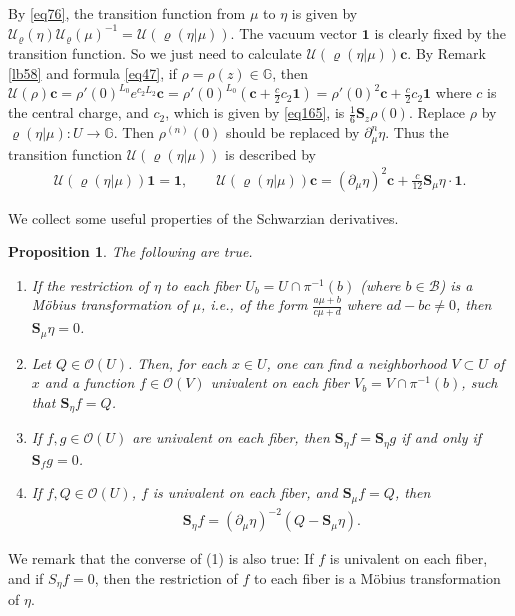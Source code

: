 \documentclass[12pt,b5paper,notitlepage]{report}
\theoremstyle{definition}
\theoremstyle{plain}
\newtheorem{pp}[df]{Proposition}
\newcommand{\mc}{\mathcal}
\newcommand{\id}{\mathbf{1}}
\newcommand{\scr}{\mathscr}
\newcommand{\Gbb}{\mathbb G}
\newcommand{\cbf}{\mathbf c}
\newcommand{\Sbf}{\mathbf{S}}
\numberwithin{equation}{section}
\begin{document}
By \eqref{eq76}, the transition function from $\mu$ to $\eta$ is given by $\mc U_\varrho(\eta)\mc U_\varrho(\mu)^{-1}=\mc U(\varrho(\eta|\mu))$. The vacuum vector $\id$ is clearly fixed by the transition function. So we just need to calculate $\mc U(\varrho(\eta|\mu))\cbf$. By Remark \ref{lb58} and formula \eqref{eq47}, if $\rho=\rho(z)\in\Gbb$, then $\mc U(\rho)\cbf=\rho'(0)^{L_0}e^{c_2L_2}\cbf=\rho'(0)^{L_0}(\cbf+\frac c2c_2\id)=\rho'(0)^2\cbf+\frac c2c_2\id$ where $c$ is the central charge, and $c_2$, which is given by \eqref{eq165}, is $\frac 16\Sbf_z\rho(0)$. Replace $\rho$ by $\varrho(\eta|\mu):U\rightarrow\Gbb$. Then $\rho^{(n)}(0)$ should be replaced by $\partial_\mu^n\eta$. Thus the transition function $\mc U(\varrho(\eta|\mu))$  is described by
\begin{gather}
\mc U(\varrho(\eta|\mu))\id=\id,\qquad  \mc U(\varrho(\eta|\mu))\cbf=(\partial_\mu\eta)^2\cbf+\frac {c}{12}\Sbf_\mu\eta \cdot \id.\label{eq169}
\end{gather}



We collect some useful properties of the Schwarzian derivatives.  

\begin{pp}\label{lb70}
The following are true.
\begin{enumerate}[label=(\arabic*)]
\item If the restriction of $\eta$ to each fiber $U_b=U\cap\pi^{-1}(b)$ (where $b\in\mc B$) is a M\"obius transformation of $\mu$, i.e., of the form $\frac{a\mu+b}{c\mu+d}$ where $ad-bc\neq 0$, then $\Sbf_\mu \eta=0$.
\item  Let $Q\in\scr O(U)$. Then, for each $x\in U$, one can find a neighborhood $V\subset U$ of $x$ and a function $f\in\scr O(V)$ univalent on each fiber $V_b=V\cap\pi^{-1}(b)$, such that $\Sbf_\eta f=Q$.
\item If $f,g\in\scr O(U)$ are univalent on each fiber, then $\Sbf_\eta f=\Sbf_\eta g$ if and only if $\Sbf_f g=0$.

\item If $f,Q\in\scr O(U)$, $f$ is univalent on each fiber, and $\Sbf_\mu f=Q$, then 
\begin{align}
\Sbf_\eta f=(\partial_\mu\eta)^{-2}(Q-\Sbf_\mu \eta).\label{eq172}
\end{align}
\end{enumerate}
\end{pp}

We remark that the converse of (1) is also true: If $f$ is univalent on each fiber, and if $S_\eta f=0$, then the restriction of $f$ to each fiber is a M\"obius transformation of $\eta$.
\end{document}
